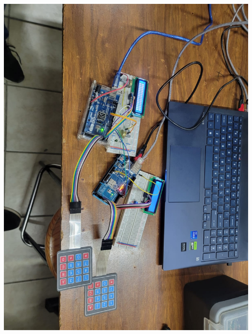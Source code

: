 \documentclass[11pt]{scrartcl}
\begin{document}
\begin{center}
    \includegraphics[scale=0.3]{imagen_circuito.jpg}
\end{center}

    
\end{document}
